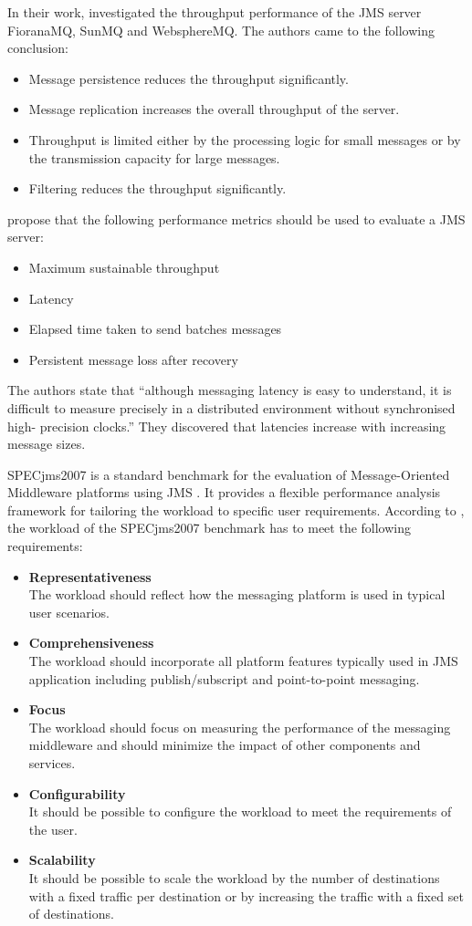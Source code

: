 In their work, \citet{Henjes:2006nx,Menth:2006ys} investigated the throughput performance of the JMS server FioranaMQ, SunMQ and WebsphereMQ. The authors came to the following conclusion:
\begin{itemize}
	\item Message persistence reduces the throughput significantly.
	\item Message replication increases the overall throughput of the server.
	\item Throughput is limited either by the processing logic for small messages or by the transmission capacity for large messages.
	\item Filtering reduces the throughput significantly.
\end{itemize}

\cite{Chen:2004cr} propose that the following performance metrics should be used to evaluate a JMS server:
\begin{itemize}
	\item Maximum sustainable throughput
	\item Latency
	\item Elapsed time taken to send batches messages
	\item Persistent message loss after recovery
\end{itemize}
The authors state that ``although messaging latency is easy to understand, it is difficult to measure precisely in a distributed environment without synchronised high- precision clocks.'' They discovered that latencies increase with increasing message sizes.

SPECjms2007 is a standard benchmark for the evaluation of Message-Oriented Middleware platforms using \ac{JMS} \citep{Sachs:2009rr}. It provides a flexible performance analysis framework for tailoring the workload to specific user requirements. According to \cite{sachs2007designing}, the workload of the SPECjms2007 benchmark has to meet the following requirements:
\begin{itemize}
	\item \textbf{Representativeness}\\
	The workload should reflect how the messaging platform is used in typical user scenarios.
	\item \textbf{Comprehensiveness}\\
	The workload should incorporate all platform features typically used in JMS application including publish/subscript and point-to-point messaging.
	\item \textbf{Focus}\\
	The workload should focus on measuring the performance of the messaging middleware and should minimize the impact of other components and services.
	\item \textbf{Configurability}\\
	It should be possible to configure the workload to meet the requirements of the user.
	\item \textbf{Scalability}\\
	It should be possible to scale the workload by the number of destinations with a fixed traffic per destination or by increasing the traffic with a fixed set of destinations.
\end{itemize}

